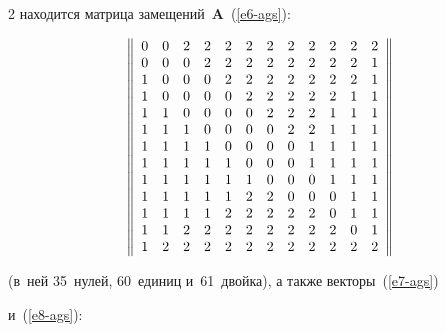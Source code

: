 \begin{multicols}{2}
находится матрица замещений~$\mathbf{A}$~(\ref{e6-ags}):





\noindent


  $$


  \left\|


  \begin{array}{cccccccccccc}


0&0&2&2&2&2&2&2&2&2&2&2\\


0&0&0&2&2&2&2&2&2&2&2&1\\


1&0&0&0&2&2&2&2&2&2&2&1\\


1&0&0&0&0&2&2&2&2&2&1&1\\


1&1&0&0&0&0&2&2&2&1&1&1\\


1&1&1&0&0&0&0&2&2&1&1&1\\


1&1&1&1&0&0&0&0&1&1&1&1\\


1&1&1&1&1&0&0&0&1&1&1&1\\


1&1&1&1&1&1&0&0&0&1&1&1\\


1&1&1&1&1&2&2&0&0&0&1&1\\


1&1&1&1&2&2&2&2&2&0&1&1\\


1&1&2&2&2&2&2&2&2&2&0&1\\


1&2&2&2&2&2&2&2&2&2&2&2


\end{array}


\right\|


\vspace*{1pt}


$$





\pagebreak





\noindent


(в~ней 35~нулей, 60~единиц и~61~двойка), а также векторы~(\ref{e7-ags}) 


и~(\ref{e8-ags}):


\begin{align*}



\end{align*}
\end{multicols}
